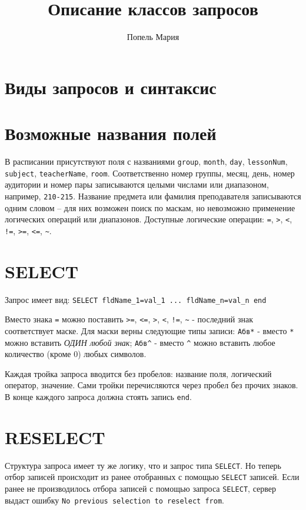 \documentclass{article}
\title{Описание классов запросов}
\author{Попель Мария}
\date{}
\begin{document}
\maketitle

\section*{Виды запросов и синтаксис}


\section*{Возможные названия полей}
В расписании присутствуют поля с названиями \texttt{group}, \texttt{month}, \texttt{day}, \texttt{lessonNum}, \texttt{subject}, \texttt{teacherName}, \texttt{room}. Соответственно номер группы, месяц, день, номер аудитории и номер пары записываются целыми числами или диапазоном, например, \texttt{210-215}. Название предмета или фамилия преподавателя записываются одним словом – для них возможен поиск по маскам, но невозможно применение логических операций или диапазонов. Доступные логические операции: \texttt{=}, \texttt{>}, \texttt{<}, \texttt{!=}, \texttt{>=}, \texttt{<=}, \texttt{\textasciitilde}.

\section*{SELECT}
Запрос имеет вид: \texttt{SELECT fldName\_1=val\_1 ... fldName\_n=val\_n end}

Вместо знака \texttt{=} можно поставить \texttt{>=}, \texttt{<=}, \texttt{>}, \texttt{<}, \texttt{!=}, \texttt{\textasciitilde} - последний знак соответствует маске. Для маски верны следующие типы записи: \texttt{Абв*} - вместо \texttt{*} можно вставить \textit{ОДИН любой знак}; \texttt{Абв\^} - вместо \texttt{\^} можно вставить любое количество (кроме 0) любых символов.

Каждая тройка запроса вводится без пробелов: название поля, логический оператор, значение. Сами тройки перечисляются через пробел без прочих знаков. В конце каждого запроса должна стоять запись \texttt{end}.

\section*{RESELECT}
Структура запроса имеет ту же логику, что и запрос типа \texttt{SELECT}. Но теперь отбор записей происходит из ранее отобранных с помощью \texttt{SELECT} записей. Если ранее не производилось отбора записей с помощью запроса \texttt{SELECT}, сервер выдаст ошибку \texttt{No previous selection to reselect from}.
\end{document}
